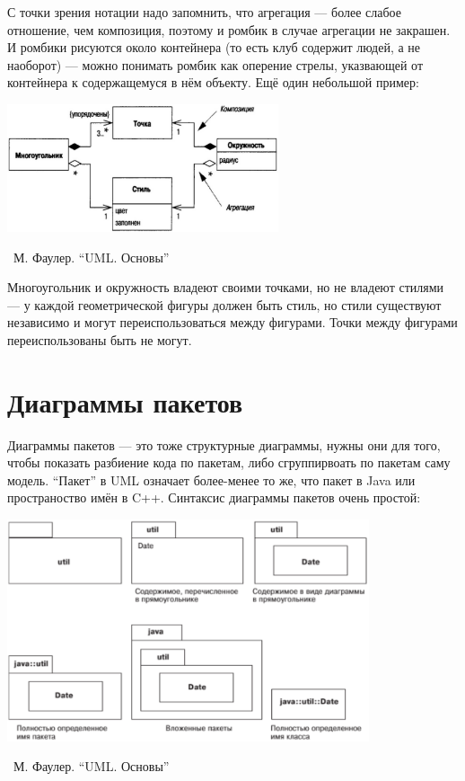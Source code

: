 \documentclass[a5paper]{article}
\newcommand{\attribution}[1] {
	\vspace{-5mm}\begin{flushright}\begin{scriptsize}%
	{\textcopyright\, #1}\end{scriptsize}\end{flushright}
}
\begin{document}
С точки зрения нотации надо запомнить, что агрегация --- более слабое отношение, чем композиция, поэтому и ромбик в случае агрегации не закрашен. И ромбики рисуются около контейнера (то есть клуб содержит людей, а не наоборот) --- можно понимать ромбик как оперение стрелы, указвающей от контейнера к содержащемуся в нём объекту. Ещё один небольшой пример:

\begin{center}
	\includegraphics[width=0.6\textwidth]{aggregationAndCompositionExample.png}
	\attribution{М. Фаулер. ``UML. Основы''}
\end{center}

Многоугольник и окружность владеют своими точками, но не владеют стилями --- у каждой геометрической фигуры должен быть стиль, но стили существуют независимо и могут переиспользоваться между фигурами. Точки между фигурами переиспользованы быть не могут.

\section{Диаграммы пакетов}

Диаграммы пакетов --- это тоже структурные диаграммы, нужны они для того, чтобы показать разбиение кода по пакетам, либо сгруппирвоать по пакетам саму модель. ``Пакет'' в UML означает более-менее то же, что пакет в Java или пространоство имён в C++. Синтаксис диаграммы пакетов очень простой:

\begin{center}
	\includegraphics[width=0.8\textwidth]{packageDiagrams.png}
	\attribution{М. Фаулер. ``UML. Основы''}
\end{center}
\end{document}
